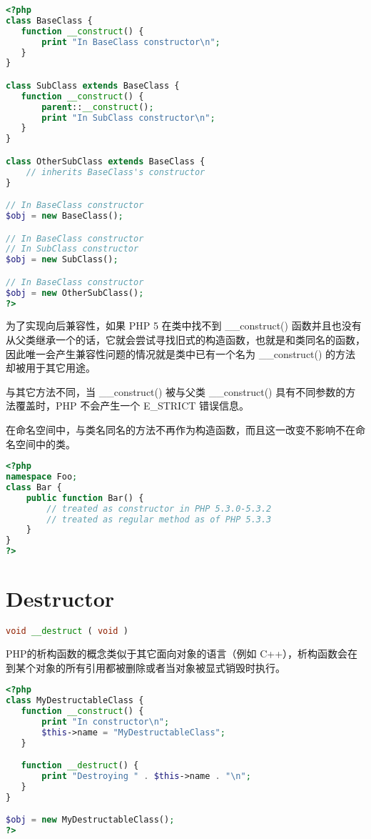 \begin{lstlisting}[language=PHP]
<?php
class BaseClass {
   function __construct() {
       print "In BaseClass constructor\n";
   }
}

class SubClass extends BaseClass {
   function __construct() {
       parent::__construct();
       print "In SubClass constructor\n";
   }
}

class OtherSubClass extends BaseClass {
    // inherits BaseClass's constructor
}

// In BaseClass constructor
$obj = new BaseClass();

// In BaseClass constructor
// In SubClass constructor
$obj = new SubClass();

// In BaseClass constructor
$obj = new OtherSubClass();
?>
\end{lstlisting}


为了实现向后兼容性，如果 PHP 5 在类中找不到 \_\_construct() 函数并且也没有从父类继承一个的话，它就会尝试寻找旧式的构造函数，也就是和类同名的函数，因此唯一会产生兼容性问题的情况就是类中已有一个名为 \_\_construct() 的方法却被用于其它用途。

与其它方法不同，当 \_\_construct() 被与父类 \_\_construct() 具有不同参数的方法覆盖时，PHP 不会产生一个 E\_STRICT 错误信息。

在命名空间中，与类名同名的方法不再作为构造函数，而且这一改变不影响不在命名空间中的类。

\begin{lstlisting}[language=PHP]
<?php
namespace Foo;
class Bar {
    public function Bar() {
        // treated as constructor in PHP 5.3.0-5.3.2
        // treated as regular method as of PHP 5.3.3
    }
}
?>
\end{lstlisting}



\chapter{Destructor}


\begin{lstlisting}[language=PHP]
void __destruct ( void )
\end{lstlisting}

PHP的析构函数的概念类似于其它面向对象的语言（例如 C++），析构函数会在到某个对象的所有引用都被删除或者当对象被显式销毁时执行。


\begin{lstlisting}[language=PHP]
<?php
class MyDestructableClass {
   function __construct() {
       print "In constructor\n";
       $this->name = "MyDestructableClass";
   }

   function __destruct() {
       print "Destroying " . $this->name . "\n";
   }
}

$obj = new MyDestructableClass();
?>
\end{lstlisting}


